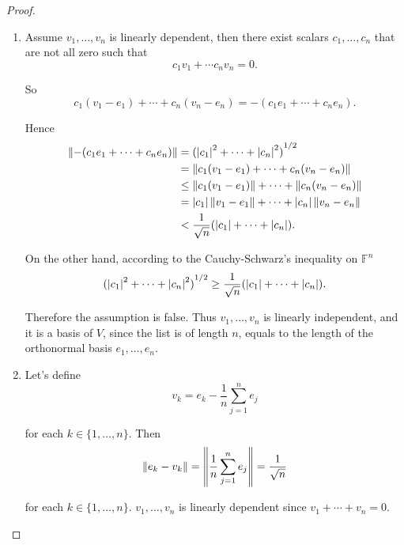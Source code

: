 \begin{proof}
    \begin{enumerate}[label={(\alph*)}]
        \item Assume $v_{1}, \ldots, v_{n}$ is linearly dependent, then there exist scalars $c_{1}, \ldots, c_{n}$ that are not all zero such that
              \[
                  c_{1}v_{1} + \cdots c_{n}v_{n} = 0.
              \]

              So
              \[
                  c_{1}(v_{1} - e_{1}) + \cdots + c_{n}(v_{n} - e_{n}) = -(c_{1}e_{1} + \cdots + c_{n}e_{n}).
              \]

              Hence
              \begin{align*}
                  \left\Vert{-(c_{1}e_{1} + \cdots + c_{n}e_{n})}\right\Vert & = {(\left\vert{c_{1}}\right\vert^{2} + \cdots + \left\vert{c_{n}}\right\vert^{2})}^{1/2}                       \\
                                                             & = \left\Vert{c_{1}(v_{1} - e_{1}) + \cdots + c_{n}(v_{n} - e_{n})}\right\Vert                \\
                                                             & \leq \left\Vert{c_{1}(v_{1} - e_{1})}\right\Vert + \cdots + \left\Vert{c_{n}(v_{n} - e_{n})}\right\Vert      \\
                                                             & = \left\vert{c_{1}}\right\vert\left\Vert{v_{1} - e_{1}}\right\Vert + \cdots + \left\vert{c_{n}}\right\vert\left\Vert{v_{n} - e_{n}}\right\Vert \\
                                                             & < \frac{1}{\sqrt{n}}(\left\vert{c_{1}}\right\vert + \cdots + \left\vert{c_{n}}\right\vert).
              \end{align*}

              On the other hand, according to the Cauchy-Schwarz's inequality on $\mathbb{F}^{n}$
              \[
                  {(\left\vert{c_{1}}\right\vert^{2} + \cdots + \left\vert{c_{n}}\right\vert^{2})}^{1/2} \geq \frac{1}{\sqrt{n}}(\left\vert{c_{1}}\right\vert + \cdots + \left\vert{c_{n}}\right\vert).
              \]

              Therefore the assumption is false. Thus $v_{1} , \ldots, v_{n}$ is linearly independent, and it is a basis of $V$, since the list is of length $n$, equals to the length of the orthonormal basis $e_{1}, \ldots, e_{n}$.
        \item Let's define
              \[
                  v_{k} = e_{k} - \frac{1}{n}\sum^{n}_{j=1}e_{j}
              \]

              for each $k\in \{ 1,\ldots, n \}$. Then
              \[
                  \left\Vert{e_{k} - v_{k}}\right\Vert = \left\Vert{\frac{1}{n}\sum^{n}_{j=1}e_{j}}\right\Vert = \frac{1}{\sqrt{n}}
              \]

              for each $k\in \{ 1,\ldots, n \}$. $v_{1}, \ldots, v_{n}$ is linearly dependent since $v_{1} + \cdots + v_{n} = 0$.
    \end{enumerate}
\end{proof}
\newpage

